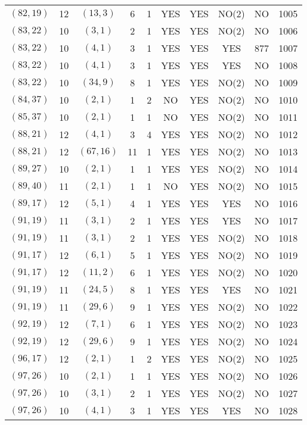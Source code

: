 \begin{longtable}{|c|c|c|c|c|c|c|c|c|c|}
$(82, 19)$ & 12 & $(13, 3)$ & 6 & 1 & YES & YES & NO(2) & NO & 1005\\
$(83, 22)$ & 10 & $(3, 1)$ & 2 & 1 & YES & YES & NO(2) & NO & 1006\\
$(83, 22)$ & 10 & $(4, 1)$ & 3 & 1 & YES & YES & YES & 877 & 1007\\
$(83, 22)$ & 10 & $(4, 1)$ & 3 & 1 & YES & YES & YES & NO & 1008\\
$(83, 22)$ & 10 & $(34, 9)$ & 8 & 1 & YES & YES & NO(2) & NO & 1009\\
$(84, 37)$ & 10 & $(2, 1)$ & 1 & 2 & NO & YES & NO(2) & NO & 1010\\
$(85, 37)$ & 10 & $(2, 1)$ & 1 & 1 & NO & YES & NO(2) & NO & 1011\\
$(88, 21)$ & 12 & $(4, 1)$ & 3 & 4 & YES & YES & NO(2) & NO & 1012\\
$(88, 21)$ & 12 & $(67, 16)$ & 11 & 1 & YES & YES & NO(2) & NO & 1013\\
$(89, 27)$ & 10 & $(2, 1)$ & 1 & 1 & YES & YES & NO(2) & NO & 1014\\
$(89, 40)$ & 11 & $(2, 1)$ & 1 & 1 & NO & YES & NO(2) & NO & 1015\\
$(89, 17)$ & 12 & $(5, 1)$ & 4 & 1 & YES & YES & YES & NO & 1016\\
$(91, 19)$ & 11 & $(3, 1)$ & 2 & 1 & YES & YES & YES & NO & 1017\\
$(91, 19)$ & 11 & $(3, 1)$ & 2 & 1 & YES & YES & NO(2) & NO & 1018\\
$(91, 17)$ & 12 & $(6, 1)$ & 5 & 1 & YES & YES & NO(2) & NO & 1019\\
$(91, 17)$ & 12 & $(11, 2)$ & 6 & 1 & YES & YES & NO(2) & NO & 1020\\
$(91, 19)$ & 11 & $(24, 5)$ & 8 & 1 & YES & YES & YES & NO & 1021\\
$(91, 19)$ & 11 & $(29, 6)$ & 9 & 1 & YES & YES & NO(2) & NO & 1022\\
$(92, 19)$ & 12 & $(7, 1)$ & 6 & 1 & YES & YES & NO(2) & NO & 1023\\
$(92, 19)$ & 12 & $(29, 6)$ & 9 & 1 & YES & YES & NO(2) & NO & 1024\\
$(96, 17)$ & 12 & $(2, 1)$ & 1 & 2 & YES & YES & NO(2) & NO & 1025\\
$(97, 26)$ & 10 & $(2, 1)$ & 1 & 1 & YES & YES & NO(2) & NO & 1026\\
$(97, 26)$ & 10 & $(3, 1)$ & 2 & 1 & YES & YES & NO(2) & NO & 1027\\
$(97, 26)$ & 10 & $(4, 1)$ & 3 & 1 & YES & YES & YES & NO & 1028\\

\end{longtable}
